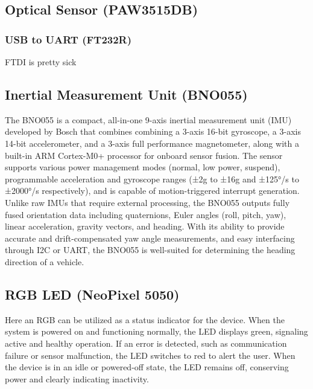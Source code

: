\documentclass[12pt]{article}
\begin{document}
        \subsection{Optical Sensor (PAW3515DB)}
            
            \subsubsection{USB to UART (FT232R)}
                FTDI is pretty sick

        \subsection{Inertial Measurement Unit (BNO055)}

            The BNO055 is a compact, all-in-one 9-axis inertial measurement unit (IMU) developed by Bosch that combines combining a 3-axis 16-bit 
            gyroscope, a 3-axis 14-bit accelerometer, and a 3-axis full performance magnetometer, along with a built-in ARM Cortex-M0+ processor 
            for onboard sensor fusion. The sensor supports various power management modes (normal, low power, suspend), programmable acceleration 
            and gyroscope ranges (±2g to ±16g and ±125°/s to ±2000°/s respectively), and is capable of motion-triggered interrupt generation. 
            Unlike raw IMUs that require external processing, the BNO055 outputs fully fused orientation data including quaternions, Euler angles 
            (roll, pitch, yaw), linear acceleration, gravity vectors, and heading. With its ability to provide accurate and drift-compensated yaw 
            angle measurements, and easy interfacing through I2C or UART, the BNO055 is well-suited for determining the heading direction of a vehicle. 

        \subsection{RGB LED (NeoPixel 5050)}

            Here an RGB can be utilized as a status indicator for the device. When the system is powered on and functioning normally, the LED displays 
            green, signaling active and healthy operation. If an error is detected, such as communication failure or sensor malfunction, the LED switches 
            to red to alert the user. When the device is in an idle or powered-off state, the LED remains off, conserving power and clearly indicating inactivity. 
\end{document}
